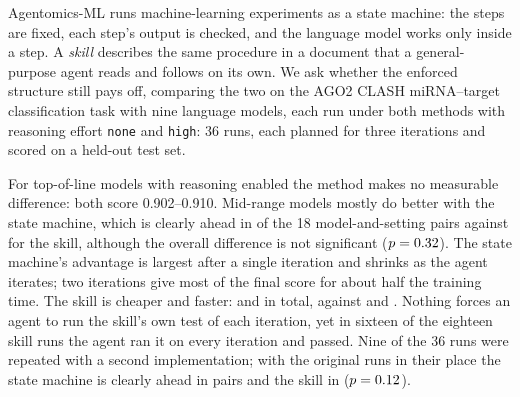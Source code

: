 \begin{list}{}{\setlength{\leftmargin}{0.5in}\setlength{\rightmargin}{0.5in}}\item[]
Agentomics-ML runs machine-learning experiments as a state machine: the steps are fixed, each step's output is checked,
and the language model works only inside a step. A \emph{skill} describes the same procedure in a document that a
general-purpose agent reads and follows on its own. We ask whether the enforced structure still pays off, comparing the
two on the AGO2 CLASH miRNA--target classification task with nine language models, each run under both methods with
reasoning effort \texttt{none} and \texttt{high}: 36 runs, each planned for three iterations and scored on a held-out test set.

For top-of-line models with reasoning enabled the method makes no measurable difference: both score 0.902--0.910. Mid-range models
mostly do better with the state machine, which is clearly ahead in \PairsSm{} of the 18 model-and-setting pairs against
\PairsSkill{} for the skill, although the overall difference is not significant ($p=0.32$). The state machine's
advantage is largest after a single iteration and shrinks as the agent iterates; two iterations give most of the final
score for about half the training time. The skill is cheaper and faster: \SkillCost{} and \SkillTime{} in total, against
\SmCost{} and \SmTime{}. Nothing forces an agent to run the skill's own test of each iteration, yet in sixteen of the
eighteen skill runs the agent ran it on every iteration and passed. Nine of the 36 runs were repeated with a second implementation; with
the original runs in their place the state machine is clearly ahead in \OrigPairsSm{} pairs and the skill in
\OrigPairsSkill{} ($p=0.12$).
\end{list}
